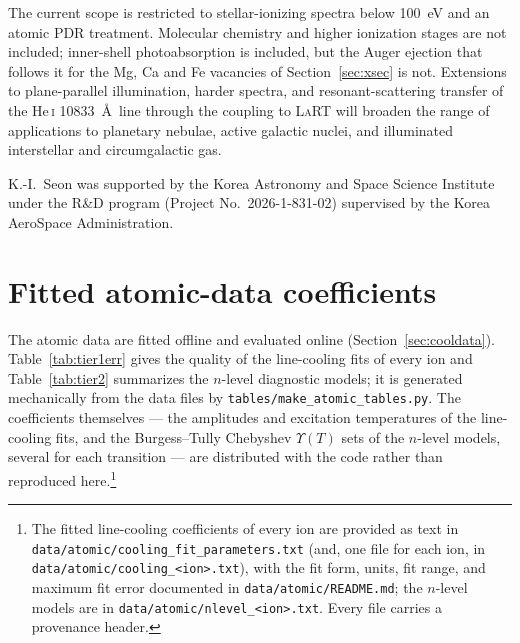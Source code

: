 \documentclass[twocolumn,linenumbers]{aastex702}
\newcommand{\code}[1]{\texttt{#1}}
\newcommand{\HeI}{He\,\textsc{i}}
\begin{document}
The current scope is restricted to stellar-ionizing spectra below 100~eV and
an atomic PDR treatment.  Molecular chemistry and higher ionization stages
are not included; inner-shell photoabsorption is included, but the Auger
ejection that follows it for the Mg, Ca and Fe vacancies of
Section~\ref{sec:xsec} is not.  Extensions to plane-parallel illumination, harder
spectra, and resonant-scattering transfer of the \HeI{} 10833~\AA\ line
through the coupling to \textsc{LaRT} will broaden the range of
applications to planetary nebulae, active galactic nuclei, and illuminated
interstellar and circumgalactic gas.

\begin{acknowledgments}
K.-I.\ Seon was supported by the Korea Astronomy and Space Science
Institute under the R\&D program (Project No.\ 2026-1-831-02) supervised by
the Korea AeroSpace Administration.
\end{acknowledgments}


\appendix

\section{Fitted atomic-data coefficients}
\label{app:atomic}

The atomic data are fitted offline and evaluated online
(Section~\ref{sec:cooldata}).  Table~\ref{tab:tier1err} gives the quality of
the line-cooling fits of every ion and Table~\ref{tab:tier2} summarizes the
$n$-level diagnostic models; it is generated mechanically from the data
files by \code{tables/make\_atomic\_tables.py}.  The coefficients
themselves --- the amplitudes and excitation temperatures of the
line-cooling fits, and the Burgess--Tully Chebyshev $\Upsilon(T)$ sets of
the $n$-level models, several for each transition --- are distributed with
the code rather than reproduced here.\footnote{The fitted line-cooling
coefficients of every ion are provided as text in
\code{data/atomic/cooling\_fit\_parameters.txt} (and, one file for each ion,
in \code{data/atomic/cooling\_<ion>.txt}), with the fit form, units, fit
range, and maximum fit error documented in \code{data/atomic/README.md};
the $n$-level models are in \code{data/atomic/nlevel\_<ion>.txt}.  Every
file carries a provenance header.}
\end{document}
